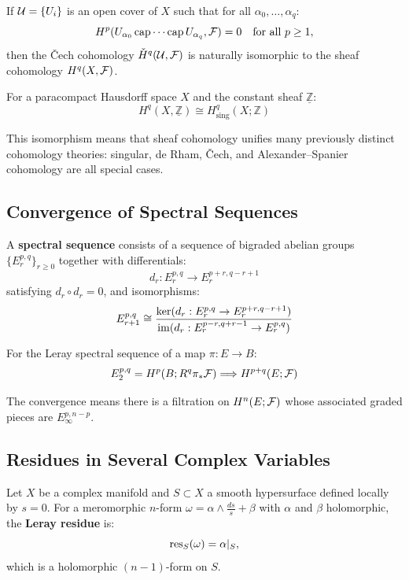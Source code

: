 \begin{theorem}
If $\mathcal{U} = \{U_i\}$ is an open cover of $X$ such that for all $\alpha_0,\dots,\alpha_q$:
\[
H^p(U_{\alpha_0} \operatorname{\mathrm{cap}} \cdots \operatorname{\mathrm{cap}} U_{\alpha_q}, \mathcal{F}) = 0 \quad \text{for all } p \geq 1,
\]
then the \v{C}ech cohomology $\check{H}^q(\mathcal{U}, \mathcal{F})$ is naturally isomorphic to the sheaf cohomology $H^q(X, \mathcal{F})$.
\end{theorem}

\begin{proposition}
For a paracompact Hausdorff space $X$ and the constant sheaf $\underline{\mathbb{Z}}$:
\[
H^q(X, \underline{\mathbb{Z}}) \cong H^q_{\text{sing}}(X; \mathbb{Z})
\]
\end{proposition}

This isomorphism means that sheaf cohomology unifies many previously distinct cohomology theories: singular, de Rham, \v{C}ech, and Alexander--Spanier cohomology are all special cases.

\subsection{Convergence of Spectral Sequences}

\begin{definition}
A \textbf{spectral sequence} consists of a sequence of bigraded abelian groups $\{E_r^{p,q}\}_{r \geq 0}$ together with differentials:
\[
d_r: E_r^{p,q} \to E_r^{p+r, q-r+1}
\]
satisfying $d_r \circ d_r = 0$, and isomorphisms:
\[
E_{r+1}^{p,q} \cong \frac{\ker(d_r: E_r^{p,q} \to E_r^{p+r,q-r+1})}{\operatorname{im}(d_r: E_r^{p-r,q+r-1} \to E_r^{p,q})}
\]
\end{definition}

For the Leray spectral sequence of a map $\pi: E \to B$:
\[
E_2^{p,q} = H^p(B; R^q \pi_* \mathcal{F}) \Longrightarrow H^{p+q}(E; \mathcal{F})
\]

The convergence means there is a filtration on $H^n(E; \mathcal{F})$ whose associated graded pieces are $E_\infty^{p,n-p}$.

\subsection{Residues in Several Complex Variables}

\begin{definition}
Let $X$ be a complex manifold and $S \subset X$ a smooth hypersurface defined locally by $s = 0$. For a meromorphic $n$-form $\omega = \alpha \wedge \frac{ds}{s} + \beta$ with $\alpha$ and $\beta$ holomorphic, the \textbf{Leray residue} is:
\[
\operatorname{res}_S(\omega) = \alpha|_S,
\]
which is a holomorphic $(n-1)$-form on $S$.
\end{definition}

